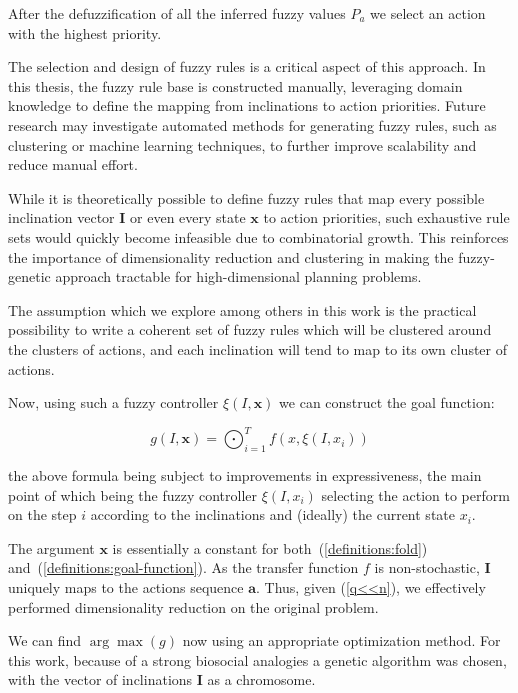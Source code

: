 \documentclass[12pt, a4paper]{article}
\begin{document}
	After the defuzzification of all the inferred fuzzy values $P_a$ we select an action with the highest priority.
	
	The selection and design of fuzzy rules is a critical aspect of this approach.
	In this thesis, the fuzzy rule base is constructed manually, leveraging domain knowledge to define the mapping from inclinations to action priorities.
	Future research may investigate automated methods for generating fuzzy rules, such as clustering or machine learning techniques, to further improve scalability and reduce manual effort.

	While it is theoretically possible to define fuzzy rules that map every possible inclination vector $\mathbf{I}$ or even every state $\mathbf{x}$ to action priorities, such exhaustive rule sets would quickly become infeasible due to combinatorial growth.
	This reinforces the importance of dimensionality reduction and clustering in making the fuzzy-genetic approach tractable for high-dimensional planning problems.

	The assumption which we explore among others in this work is the practical possibility to write a coherent set of fuzzy rules which will be clustered around the clusters of actions, and each inclination will tend to map to its own cluster of actions.
	
	Now, using such a fuzzy controller $\xi(I, \mathbf{x})$ we can construct the goal function:
	
	\begin{equation}\label{definitions:goal-function}
		g(I, \mathbf{x}) = \bigodot_{i=1}^{T} f(x, \xi(I, x_i))
	\end{equation}
	
	the above formula being subject to improvements in expressiveness,
	the main point of which being the fuzzy controller $\xi(I, x_i)$ selecting the action to perform on the step $i$ according to the inclinations and (ideally) the current state $x_i$.
	
	The argument $\mathbf{x}$ is essentially a constant for both~(\ref{definitions:fold}) and~(\ref{definitions:goal-function}).
	As the transfer function $f$ is non-stochastic, $\mathbf{I}$ uniquely maps to the actions sequence $\mathbf{a}$.
	Thus, given (\ref{q<<n}), we effectively performed dimensionality reduction on the original problem.
		
	We can find $\arg \max(g)$ now using an appropriate optimization method.
	For this work, because of a strong biosocial analogies a genetic algorithm\cite{mitchell1999geneticalgorithms} was chosen,
	with the vector of inclinations $\mathbf{I}$ as a chromosome.
	
\end{document}
